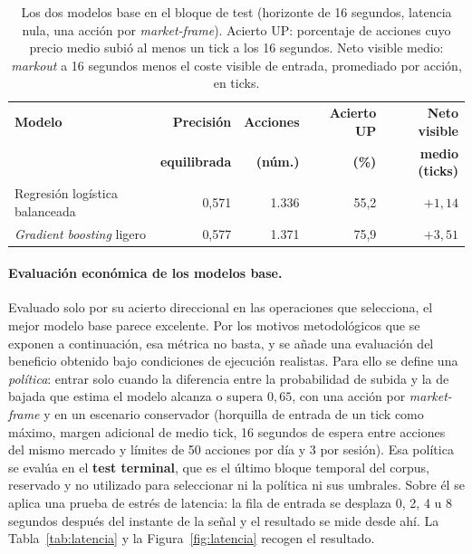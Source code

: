 \begin{table}[h]
\centering
\caption[Los dos modelos base en el bloque de test]{Los dos modelos base en el bloque de
test (horizonte de 16 segundos, latencia nula, una acción por \emph{market-frame}). Acierto
UP: porcentaje de acciones cuyo precio medio subió al menos un tick a los 16 segundos. Neto
visible medio: \emph{markout} a 16 segundos menos el coste visible de entrada, promediado
por acción, en ticks.}
\label{tab:modelos_base}
\small
\begin{tabular}{lrrrr}
\toprule
\textbf{Modelo} & \textbf{Precisión} & \textbf{Acciones} & \textbf{Acierto UP} & \textbf{Neto visible} \\
 & \textbf{equilibrada} & \textbf{(núm.)} & \textbf{(\%)} & \textbf{medio (ticks)} \\
\midrule
Regresión logística balanceada & 0,571 & 1.336 & 55,2 & $+1{,}14$ \\
\emph{Gradient boosting} ligero & 0,577 & 1.371 & 75,9 & $+3{,}51$ \\
\bottomrule
\end{tabular}
\end{table}

\paragraph{Evaluación económica de los modelos base.} Evaluado solo por su acierto
direccional en las operaciones que selecciona, el mejor modelo base parece excelente. Por
los motivos metodológicos que se
exponen a continuación, esa métrica no basta, y se añade una evaluación del beneficio obtenido bajo condiciones de ejecución realistas. Para
ello se define una \emph{política}: entrar solo cuando la diferencia entre la probabilidad
de subida y la de bajada que estima el modelo alcanza o supera $0{,}65$, con una acción por
\emph{market-frame} y en un escenario conservador (horquilla de entrada de un tick como
máximo, margen adicional de medio tick, 16 segundos de espera entre acciones del mismo
mercado y límites de 50 acciones por día y 3 por sesión). Esa política se evalúa en el
\textbf{test terminal}, que es el último bloque temporal del corpus, reservado y no
utilizado para seleccionar ni la política ni sus umbrales. Sobre él se aplica una prueba de
estrés de latencia: la fila de entrada se desplaza 0, 2, 4 u 8 segundos después del instante
de la señal y el resultado se mide desde ahí. La Tabla~\ref{tab:latencia} y la
Figura~\ref{fig:latencia} recogen el resultado.

